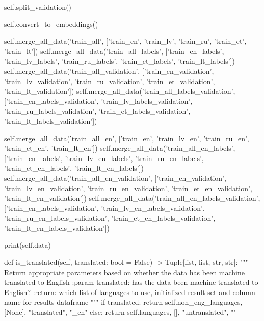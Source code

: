 \begin{python}
        self.split_validation()

        self.convert_to_embeddings()

        self.merge_all_data('train_all', ['train_en', 'train_lv', 'train_ru', 'train_et', 'train_lt'])
        self.merge_all_data('train_all_labels',
                            ['train_en_labels', 'train_lv_labels', 'train_ru_labels', 'train_et_labels',
                             'train_lt_labels'])
        self.merge_all_data('train_all_validation',
                            ['train_en_validation', 'train_lv_validation', 'train_ru_validation', 'train_et_validation',
                             'train_lt_validation'])
        self.merge_all_data('train_all_labels_validation', ['train_en_labels_validation', 'train_lv_labels_validation',
                                                            'train_ru_labels_validation', 'train_et_labels_validation',
                                                            'train_lt_labels_validation'])

        self.merge_all_data('train_all_en', ['train_en', 'train_lv_en', 'train_ru_en', 'train_et_en', 'train_lt_en'])
        self.merge_all_data('train_all_en_labels',
                            ['train_en_labels', 'train_lv_en_labels', 'train_ru_en_labels', 'train_et_en_labels',
                             'train_lt_en_labels'])
        self.merge_all_data('train_all_en_validation',
                            ['train_en_validation', 'train_lv_en_validation', 'train_ru_en_validation',
                             'train_et_en_validation',
                             'train_lt_en_validation'])
        self.merge_all_data('train_all_en_labels_validation',
                            ['train_en_labels_validation', 'train_lv_en_labels_validation',
                             'train_ru_en_labels_validation',
                             'train_et_en_labels_validation', 'train_lt_en_labels_validation'])

        print(self.data)

    def is_translated(self, translated: bool = False) -> Tuple[list, list, str, str]:
        """ Return appropriate parameters based on whether the data has been machine translated to English
        :param translated: has the data been machine translated to English?
        :return: which list of languages to use, initialized result set and column name for results dataframe
        """
        if translated:
            return self.non_eng_languages, [None], "translated", "_en"
        else:
            return self.languages, [], "untranslated", ""


\end{python}
